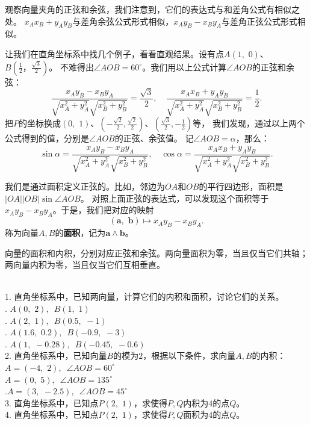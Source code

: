 \documentclass[12pt,UTF8,fontset=none]{ctexbook}
\begin{document}
观察向量夹角的正弦和余弦，我们注意到，它们的表达式与和差角公式有相似之处。
$x_Ax_B + y_Ay_B$与差角余弦公式形式相似，$x_Ay_B - x_By_A$与差角正弦公式形式相似。

让我们在直角坐标系中找几个例子，看看直观结果。设有点$A(1,\,\,0)$、$B(\frac{1}{2}，\frac{\sqrt{3}}{2})$。
不难得出$\angle AOB = 60^\circ$。我们用以上公式计算$\angle AOB$的正弦和余弦：
$$ \frac{x_Ay_B - x_By_A}{\sqrt{x_A^2 + y_A^2}\sqrt{x_B^2 + y_B^2}} = \frac{\sqrt{3}}{2}, \quad \frac{x_Ax_B + y_Ay_B}{\sqrt{x_A^2 + y_A^2} \sqrt{x_B^2 + y_B^2}} = \frac{1}{2}. $$
把$P$的坐标换成$(0,\,\,1)$、$(-\frac{\sqrt{2}}{2}, \frac{\sqrt{2}}{2})$、$(\frac{\sqrt{3}}{2},-\frac{1}{2})$等，
我们发现，通过以上两个公式得到的值，分别是$\angle AOB$的正弦、余弦值。
记$\angle AOB = \alpha$，那么：
$$ \sin \alpha = \frac{x_Ay_B - x_By_A}{\sqrt{x_A^2 + y_A^2}\sqrt{x_B^2 + y_B^2}}, \quad \cos \alpha = \frac{x_Ax_B + y_Ay_B}{\sqrt{x_A^2 + y_A^2} \sqrt{x_B^2 + y_B^2}}. $$

我们是通过面积定义正弦的。比如，邻边为$OA$和$OB$的平行四边形，面积是$|OA||OB|\sin \angle AOB$。
对照上面正弦的表达式，可以发现这个面积等于$x_Ay_B - x_By_A$。于是，我们把对应的映射
$$ (\mathbf{a}, \,\,\mathbf{b}) \mapsto x_Ay_B - x_By_A. $$
称为向量$A, B$的\textbf{面积}，记为$\mathbf{a} \wedge \mathbf{b}$。

向量的面积和内积，分别对应正弦和余弦。两向量面积为零，当且仅当它们共轴；两向量内积为零，当且仅当它们互相垂直。

\begin{xt}
    \mbox{} \\
    1. 直角坐标系中，已知两向量，计算它们的内积和面积，讨论它们的关系。\\
    . $A(0,\,\, 2), \,\,\, B(1, \,\,1)$ \\
    . $A(2,\,\, 1),\,\,\,  B(0.5, \,\,-1)$ \\
    . $A(1.6,\,\, 0.2), \,\,\, B(-0.9,\,\, -3)$\\
    . $A(1, \,\,-0.28), \,\,\, B(-0.45,\,\, -0.6)$\\
    2. 直角坐标系中，已知向量$B$的模为$2$，根据以下条件，求向量$A,B$的内积：\\
     $A = (-4, \,\,2), \,\,\, \angle AOB = 60^\circ$\\
     $A= (0,\,\, 5), \,\,\,\angle AOB = 135^\circ$\\
    .$A = (3,\,\, -2.5), \,\,\,\angle AOB = 45^\circ$\\
    3. 直角坐标系中，已知点$P(2,\,\,1)$，求使得$P,Q$内积为$4$的点$Q$。\\
    4. 直角坐标系中，已知点$P(2,\,\,1)$，求使得$P,Q$面积为$4$的点$Q$。
\end{xt}
\end{document}
